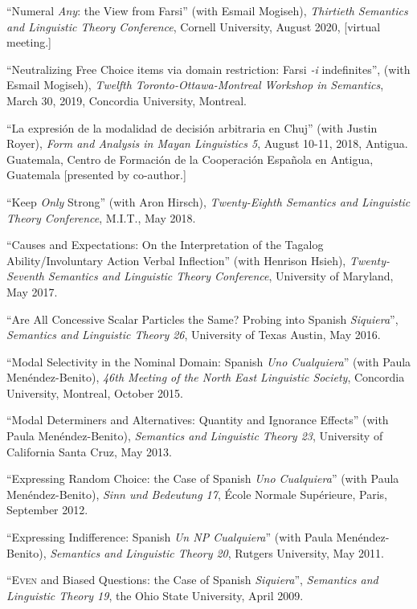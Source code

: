 \documentclass[11pt]{article}
\begin{document}
``Numeral \textit{Any}: the View from Farsi'' (with Esmail Mogiseh), \textit{Thirtieth Semantics and Linguistic Theory Conference}, Cornell University, August 2020, [virtual meeting.]

``Neutralizing Free Choice items via domain restriction: Farsi \textit{-i} indefinites'', (with Esmail Mogiseh), \textit{Twelfth Toronto-Ottawa-Montreal Workshop in Semantics}, March 30, 2019, Concordia University, Montreal.

``La expresi\'on de la modalidad de decisi\'on arbitraria en Chuj'' (with Justin Royer), \textit{Form and Analysis in Mayan Linguistics 5}, August 10-11, 2018, Antigua. Guatemala, Centro de Formaci\'on de la Cooperaci\'on Espa\~nola en Antigua, Guatemala [presented by co-author.]

``Keep \textit{Only} Strong'' (with Aron Hirsch), \textit{Twenty-Eighth Semantics and Linguistic Theory Conference}, M.I.T., May 2018. 

``Causes and Expectations: On the Interpretation of the Tagalog Ability/Involuntary Action Verbal Inflection'' (with Henrison Hsieh), \textit{Twenty-Seventh Semantics and Linguistic Theory Conference}, University of Maryland, May 2017. 


``Are All Concessive Scalar Particles the Same? Probing into Spanish \textit{Siquiera}'', \textit{Semantics and Linguistic Theory 26}, University of Texas Austin, May 2016. 

``Modal Selectivity in the Nominal Domain: Spanish \textit{Uno Cualquiera}'' (with Paula Men\'endez-Benito), \textit{46th Meeting of the North East Linguistic Society}, Concordia University, Montreal, October 2015. 

``Modal Determiners and Alternatives: Quantity and Ignorance
Effects'' (with Paula Men\'endez-Benito), \textit{Semantics and
  Linguistic Theory 23}, University of California Santa Cruz, May 2013. 

``Expressing Random
Choice: the Case of Spanish \textit{Uno Cualquiera}''  (with Paula Men\'endez-Benito), \textit{Sinn
  und Bedeutung 17}, \'{E}cole Normale Sup\'{e}rieure, Paris, September 2012.

``Expressing Indifference: Spanish \textit{Un NP
  Cualquiera}'' (with Paula Men\'endez-Benito), \textit{Semantics and
Linguistic Theory 20}, Rutgers University, May 2011. 

``\textsc{Even} and Biased Questions: the Case of Spanish \textit{Siquiera}'', \textit{Semantics and Linguistic Theory 19}, the Ohio State University, April 2009. 
\end{document}
